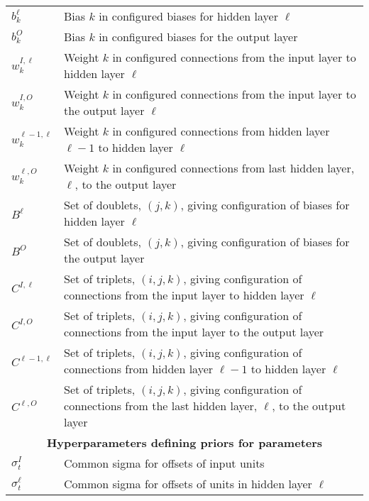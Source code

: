 \documentclass{report}[11pt]
\begin{document}
\begin{table}[p]
\begin{center}
\begin{tabular}{ll}
  $b^{\ell}_k$       & Bias $k$ in configured biases for hidden 
                       layer $\ell$ \\[3pt]
  $b^O_k$            & Bias $k$ in configured biases for the output 
                       layer \\[3pt]
  $w^{I,\ell}_k$     & Weight $k$ in configured connections from the input layer
                       to hidden layer $\ell$ \\[3pt]
  $w^{I,O}_k$        & Weight $k$ in configured connections from the input layer
                       to the output layer $\ell$ \\[3pt]
  $w^{\ell\!-\!1,\ell}_k$ & Weight $k$ in configured connections from hidden 
                        layer $\ell\!-\!1$ to hidden layer $\ell$ \\[3pt]
  $w^{\ell,O}_k$     & Weight $k$ in configured connections from last hidden 
                        layer, $\ell$, to the output layer \\[3pt]
  $B^{\ell}$         & Set of doublets, $(j,k)$, giving configuration of
                       biases for hidden layer $\ell$ \\[3pt]
  $B^{O}$            & Set of doublets, $(j,k)$, giving configuration of
                       biases for the output layer \\[3pt]
  $C^{I,\ell}$       & Set of triplets, $(i,j,k)$, giving configuration of
                       connections from the input layer to hidden 
                       layer $\ell$ \\[3pt]
  $C^{I,O}$          & Set of triplets, $(i,j,k)$, giving configuration of
                       connections from the input layer to the output 
                       layer \\[3pt]
  $C^{\ell\!-\!1,\ell}$  & Set of triplets, $(i,j,k)$, giving configuration of
                       connections from hidden layer $\ell\!-\!1$ to hidden 
                       layer $\ell$\\[3pt]
  $C^{\ell,O}$       & Set of triplets, $(i,j,k)$, giving configuration of
                       connections from the last hidden layer, $\ell$, to the
                       output layer \\[11pt]
%
  \multicolumn{2}{c}{\bf Hyperparameters defining priors for parameters} \\[5pt]
%
  $\sigma^I_t$        & Common sigma for offsets of input units \\[3pt]
  $\sigma^{\ell}_t$   & Common sigma for offsets of units in hidden layer 
                      $\ell$ \\[10pt]


\end{tabular}
\end{center}
\end{table}
\end{document}
